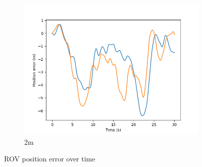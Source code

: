 \documentclass[class=article, crop=false]{standalone}
\begin{document}
\begin{figure}
\begin{subfigure}[b]{0.48\textwidth}
        \includegraphics{scenario1/rov-50m/2.0m/rov_position_error_controlled}
        \caption{2m}
        \label{}
    \end{subfigure}

    \caption{ROV position error over time}
\end{figure}
\end{document}
